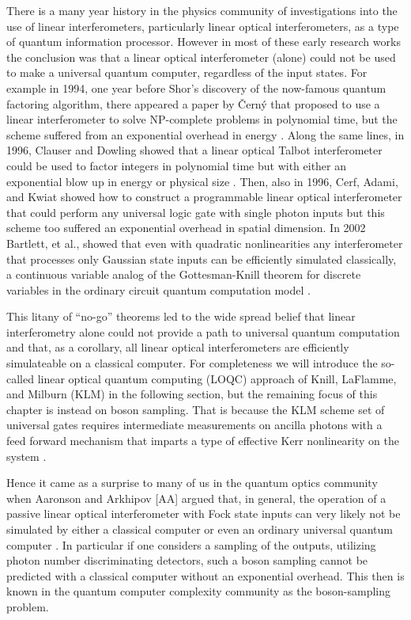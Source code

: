 \documentclass[aps,pra,twocolumn,amsmath,amssymb,nofootinbib,superscriptaddress]{revtex4}
\begin{document}
	There is a many year history in the physics community of investigations into the use of linear interferometers, particularly linear optical interferometers, as a type of quantum information processor. However in most of these early research works the conclusion was that a linear optical interferometer (alone) could not be used to make a universal quantum computer, regardless of the input states. For example in 1994, one year before Shor’s discovery of the now-famous quantum factoring algorithm, there appeared a paper by Černý that proposed to use a linear interferometer to solve NP-complete problems in polynomial time, but the scheme suffered from an exponential overhead in energy \cite{cerny}. Along the same lines, in 1996, Clauser and Dowling showed that a linear optical Talbot interferometer could be used to factor integers in polynomial time but with either an exponential blow up in energy or physical size \cite{clauser}. Then, also in 1996, Cerf, Adami, and Kwiat showed how to construct a programmable linear optical interferometer that could perform any universal logic gate with single photon inputs but this scheme too suffered an exponential overhead in spatial dimension. In 2002 Bartlett, et al., showed that even with quadratic nonlinearities any interferometer that processes only Gaussian state inputs can be efficiently simulated classically, a continuous variable analog of the Gottesman-Knill theorem for discrete variables in the ordinary circuit quantum computation model \cite{bart}. 

	This litany of ``no-go'' theorems led to the wide spread belief that linear interferometry alone could not provide a path to universal quantum computation and that, as a corollary, all linear optical interferometers are efficiently simulateable on a classical computer. For completeness we will introduce the so-called linear optical quantum computing (LOQC) approach of Knill, LaFlamme, and Milburn (KLM) \cite{knill,kok} in the following section, but the remaining focus of this chapter is instead on boson sampling. That is because the KLM scheme set of universal gates requires intermediate measurements on ancilla photons with a feed forward mechanism that imparts a type of effective Kerr nonlinearity on the system \cite{lap}. 

	Hence it came as a surprise to many of us in the quantum optics community when Aaronson and Arkhipov [AA] argued that, in general, the operation of a passive linear optical interferometer with Fock state inputs can very likely not be simulated by either a classical computer or even an ordinary universal quantum computer \cite{aar}. In particular if one considers a sampling of the outputs, utilizing photon number discriminating detectors, such a boson sampling cannot be predicted with a classical computer without an exponential overhead. This then is known in the quantum computer complexity community as the boson-sampling problem. 
\end{document}
